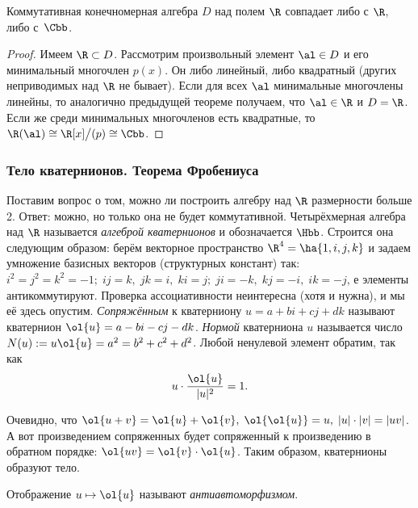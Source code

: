 \documentclass[a4paper]{article}
\begin{document}
\begin{theorem}
Коммутативная конечномерная алгебра $D$ над полем $\R$ совпадает либо с $\R$, либо с~$\Cbb$.
\end{theorem}
\begin{proof}
Имеем $\R \subset D$. Рассмотрим произвольный элемент $\al \in D$ и его минимальный многочлен $p(x)$.  Он
либо линейный, либо квадратный (других неприводимых над $\R$ не бывает). Если для всех $\al$ минимальные
многочлены линейны, то аналогично предыдущей теореме получаем, что $\al \in \R$ и $D=\R$. Если же среди минимальных
многочленов есть квадратные, то $\R(\al) \cong \R[x]\bigl/(p) \cong \Cbb$.
\end{proof}

\subsubsection{Тело кватернионов. Теорема Фробениуса}

Поставим вопрос о том, можно ли построить алгебру над $\R$ размерности больше 2. Ответ: можно, но только она
не будет коммутативной. Четырёхмерная алгебра над $\R$ называется \emph{\emph{алгеброй кватернионов}} и
обозначается $\Hbb$. Строится она следующим образом: берём векторное пространство $\R^4 = \ha{1,i,j,k}$ и
задаем умножение базисных векторов (структурных констант) так: $i^2=j^2=k^2=-1; \; ij=k, \; jk=i, \; ki=j; \;
ji=-k, \; kj=-i, \; ik=-j$, е элементы антикоммутируют. Проверка ассоциативности неинтересна (хотя и нужна),
и мы её здесь опустим. \emph{\emph{Сопряжённым}} к кватерниону $u=a+bi+cj+dk$
называют кватернион $\ol{u}=a-bi-cj-dk$. \emph{\emph{Нормой}} кватерниона $u$ называется число
$N(u):=u\ol{u}=a^2=b^2+c^2+d^2$. Любой ненулевой элемент обратим, так как
$$u \cdot \frac{\ol{u}}{|u|^2}=1.$$

Очевидно, что $\ol{u+v}=\ol{u}+\ol{v}, \; \ol{\ol{u}}=u, \; |u|\cdot|v|=|uv|$. А вот произведением
сопряженных будет сопряженный к произведению в обратном порядке: $\ol{uv}=\ol{v} \cdot \ol{u}$. Таким
образом, кватернионы образуют тело.

\begin{note}
Отображение $u \mapsto \ol{u}$ называют \emph{\emph{антиавтоморфизмом}}.
\end{note}
\end{document}
